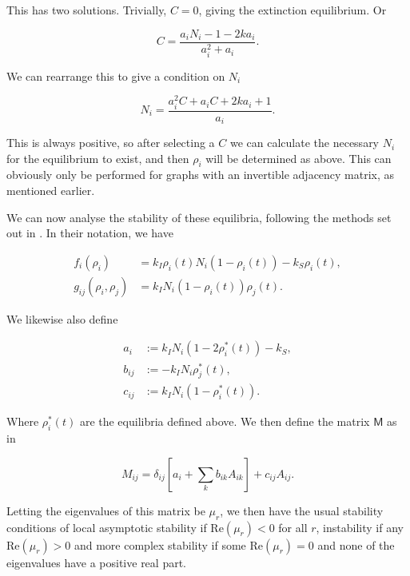 \documentclass[12pt,a4paper,openany,twoside]{book}
\newcommand{\m}[1]{\bm{\mathsf{#1}}}	 %
\begin{document}
This has two solutions. Trivially, $C=0$, giving the extinction equilibrium. Or

\begin{equation}
	C = \frac {a_i N_i - 1 - 2 k a_i} {a_i^2 + a_i}.
\end{equation}

We can rearrange this to give a condition on $N_i$

\begin{equation}
	N_i = \frac {a_i^2 C + a_i C + 2 k a_i + 1} {a_i}.
\end{equation}

This is always positive, so after selecting a $C$ we can calculate the necessary $N_i$ for the equilibrium to exist, and then $\rho_i$ will be determined as above. This can obviously only be performed for graphs with an invertible adjacency matrix, as mentioned earlier.

We can now analyse the stability of these equilibria, following the methods set out in \citep{porterDynamicalSystemsNetworks2015}. In their notation, we have

\begin{align}
	f_i(\rho_i) &= k_I \rho_i(t) N_i (1 - \rho_i(t)) - k_S \rho_i(t), \\
	g_{ij}(\rho_i, \rho_j) &= k_I N_i (1 - \rho_i(t)) \rho_j(t).
\end{align}

We likewise also define

\begin{align}
	a_i &:= k_I N_i (1 - 2 \rho_i^*(t)) - k_S, \\
	b_{ij} &:= -k_I N_i \rho_j^*(t), \\
	c_{ij} &:= k_I N_i (1 - \rho_i^*(t)).
\end{align}

Where $\rho_i^*(t)$ are the equilibria defined above. We then define the matrix $\m M$ as in \citep{porterDynamicalSystemsNetworks2015}

\begin{equation}
	M_{ij} = \delta_{ij} \left[ a_i + \sum_k b_{ik} A_{ik} \right] + c_{ij} A_{ij}.
\end{equation}

Letting the eigenvalues of this matrix be $\mu_r$, we then have the usual stability conditions of local asymptotic stability if $\mathrm{Re}(\mu_r) < 0$ for all $r$, instability if any $\mathrm{Re}(\mu_r)> 0$ and more complex stability if some $\mathrm{Re} (\mu_r) = 0$ and none of the eigenvalues have a positive real part.
\end{document}
